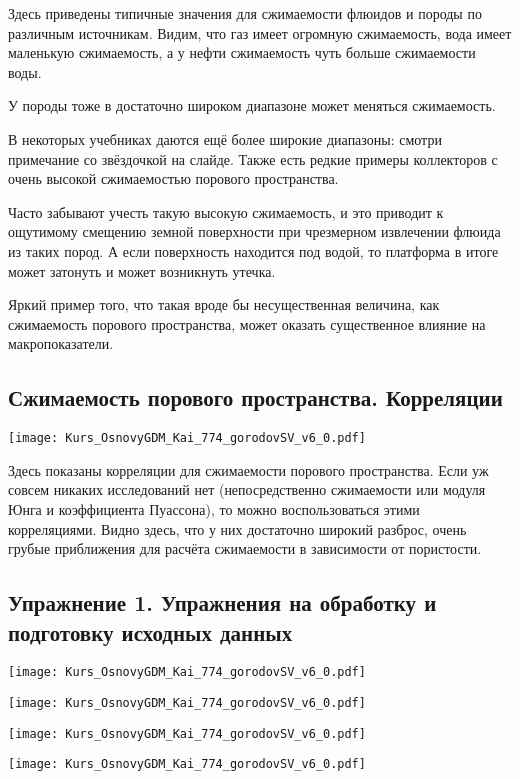 \documentclass[main.tex]{subfiles}
\begin{document}
Здесь приведены типичные значения для сжимаемости флюидов и породы по различным источникам.
Видим, что газ имеет огромную сжимаемость, вода имеет маленькую сжимаемость, а у нефти сжимаемость чуть больше сжимаемости воды.

У породы тоже в достаточно широком диапазоне может меняться сжимаемость.

В некоторых учебниках даются ещё более широкие диапазоны: смотри примечание со звёздочкой на слайде.
Также есть редкие примеры коллекторов с очень высокой сжимаемостью порового пространства.

Часто забывают учесть такую высокую сжимаемость, и это приводит к ощутимому смещению земной поверхности при чрезмерном извлечении флюида из таких пород.
А если поверхность находится под водой, то платформа в итоге может затонуть и может возникнуть утечка.

Яркий пример того, что такая вроде бы несущественная величина, как сжимаемость порового пространства, может оказать существенное влияние на макропоказатели.

\subsection{Сжимаемость порового пространства. Корреляции}

\texttt{[image: Kurs\_OsnovyGDM\_Kai\_774\_gorodovSV\_v6\_0.pdf]}

Здесь показаны корреляции для сжимаемости порового пространства.
Если уж совсем никаких исследований нет (непосредственно сжимаемости или модуля Юнга и коэффициента Пуассона), то можно воспользоваться этими корреляциями.
Видно здесь, что у них достаточно широкий разброс, очень грубые приближения для расчёта сжимаемости в зависимости от пористости.

\subsection{Упражнение 1. Упражнения на обработку и подготовку исходных данных}

\texttt{[image: Kurs\_OsnovyGDM\_Kai\_774\_gorodovSV\_v6\_0.pdf]}

\texttt{[image: Kurs\_OsnovyGDM\_Kai\_774\_gorodovSV\_v6\_0.pdf]}

\texttt{[image: Kurs\_OsnovyGDM\_Kai\_774\_gorodovSV\_v6\_0.pdf]}

\texttt{[image: Kurs\_OsnovyGDM\_Kai\_774\_gorodovSV\_v6\_0.pdf]}
\end{document}
